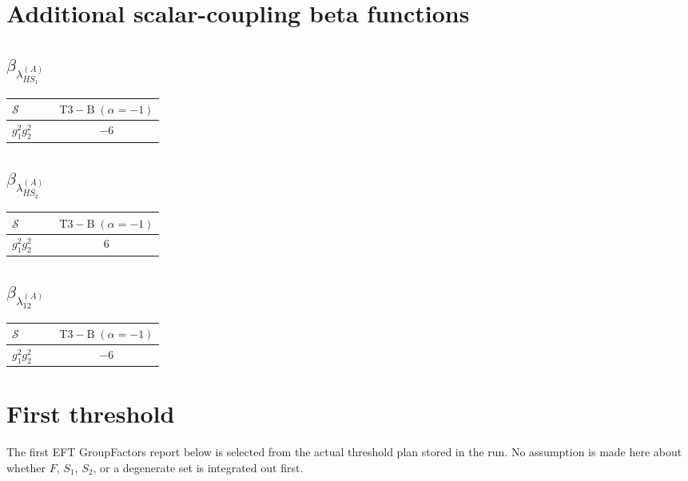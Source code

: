 \documentclass[9pt]{article}
\begin{document}
\section*{Additional scalar-coupling beta functions}
\subsection*{$ \beta_{\lambda_{HS_1}^{(A)}} $}
\begin{longtable}{@{}p{0.31\linewidth}c@{}}
\toprule
$\mathcal{S}$ & $ \mathrm{T3-B}\;(\alpha=-1) $ \\
\midrule
$ g_1^2g_2^2 $ & $ -6 $ \\
\bottomrule
\end{longtable}
\subsection*{$ \beta_{\lambda_{HS_2}^{(A)}} $}
\begin{longtable}{@{}p{0.31\linewidth}c@{}}
\toprule
$\mathcal{S}$ & $ \mathrm{T3-B}\;(\alpha=-1) $ \\
\midrule
$ g_1^2g_2^2 $ & $ 6 $ \\
\bottomrule
\end{longtable}
\subsection*{$ \beta_{\lambda_{12}^{(A)}} $}
\begin{longtable}{@{}p{0.31\linewidth}c@{}}
\toprule
$\mathcal{S}$ & $ \mathrm{T3-B}\;(\alpha=-1) $ \\
\midrule
$ g_1^2g_2^2 $ & $ -6 $ \\
\bottomrule
\end{longtable}
\section*{First threshold}
The first EFT GroupFactors report below is selected from the actual threshold plan stored in the run.  No assumption is made here about whether $F$, $S_1$, $S_2$, or a degenerate set is integrated out first.
\end{document}
